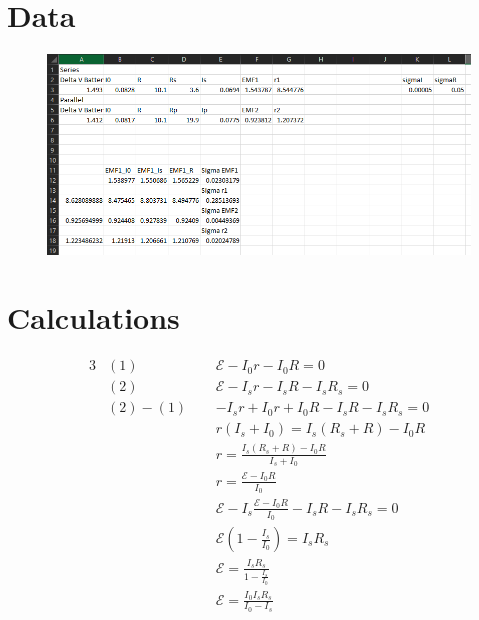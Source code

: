 \documentclass[12pt]{article}
\def\E{\mathcal{E}}
\begin{document}
    \section*{Data}
        \begin{figure}[H]
            \centering
            \includegraphics[width=0.85\linewidth]{data.png}
        \end{figure}
    \section*{Calculations}
    \begin{alignat*}{3}
        &(1)~~&&\E - I_0r - I_0R = 0\\
        &(2)~~&&\E - I_sr-I_sR-I_sR_s=0\\
        &(2)-(1)~~&&-I_sr+I_0r+I_0R-I_sR-I_sR_s=0\\
        &&&r(I_s+I_0)=I_s(R_s+R)-I_0R\\
        &&&r=\frac{I_s(R_s+R)-I_0R}{I_s+I_0}\\
        &&&r=\frac{\E-I_0R}{I_0}\\
        &&&\E-I_s\frac{\E-I_0R}{I_0}-I_sR-I_sR_s = 0\\
        &&&\E(1-\frac{I_s}{I_0})=I_sR_s\\
        &&&\E=\frac{I_sR_s}{1-\frac{I_s}{I_0}}\\
        &&&\E=\frac{I_0I_sR_s}{I_0-I_s}
    \end{alignat*}
\end{document}
